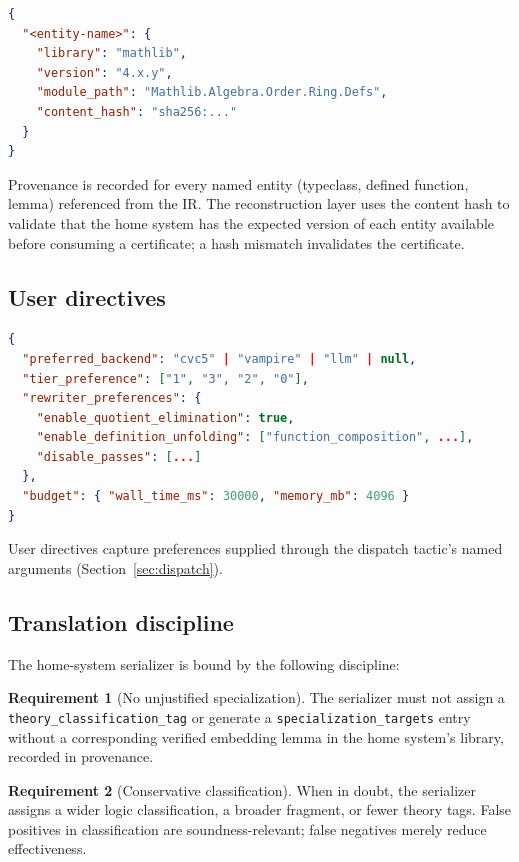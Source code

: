 \documentclass[11pt,letterpaper]{article}
\theoremstyle{definition}
\newtheorem{requirement}{Requirement}[section]
\theoremstyle{remark}
\begin{document}
\begin{lstlisting}[language=json]
{
  "<entity-name>": {
    "library": "mathlib",
    "version": "4.x.y",
    "module_path": "Mathlib.Algebra.Order.Ring.Defs",
    "content_hash": "sha256:..."
  }
}
\end{lstlisting}

Provenance is recorded for every named entity (typeclass, defined
function, lemma) referenced from the IR. The reconstruction layer uses
the content hash to validate that the home system has the expected
version of each entity available before consuming a certificate; a hash
mismatch invalidates the certificate.

\subsection{User directives}

\begin{lstlisting}[language=json]
{
  "preferred_backend": "cvc5" | "vampire" | "llm" | null,
  "tier_preference": ["1", "3", "2", "0"],
  "rewriter_preferences": {
    "enable_quotient_elimination": true,
    "enable_definition_unfolding": ["function_composition", ...],
    "disable_passes": [...]
  },
  "budget": { "wall_time_ms": 30000, "memory_mb": 4096 }
}
\end{lstlisting}

User directives capture preferences supplied through the dispatch
tactic's named arguments (Section~\ref{sec:dispatch}).

\subsection{Translation discipline}
\label{sec:ir-discipline}

The home-system serializer is bound by the following discipline:

\begin{requirement}[No unjustified specialization]
The serializer must not assign a \texttt{theory\_classification\_tag} or
generate a \texttt{specialization\_targets} entry without a corresponding
verified embedding lemma in the home system's library, recorded in
provenance.
\end{requirement}

\begin{requirement}[Conservative classification]
When in doubt, the serializer assigns a wider logic classification, a
broader fragment, or fewer theory tags. False positives in
classification are soundness-relevant; false negatives merely reduce
effectiveness.
\end{requirement}
\end{document}
